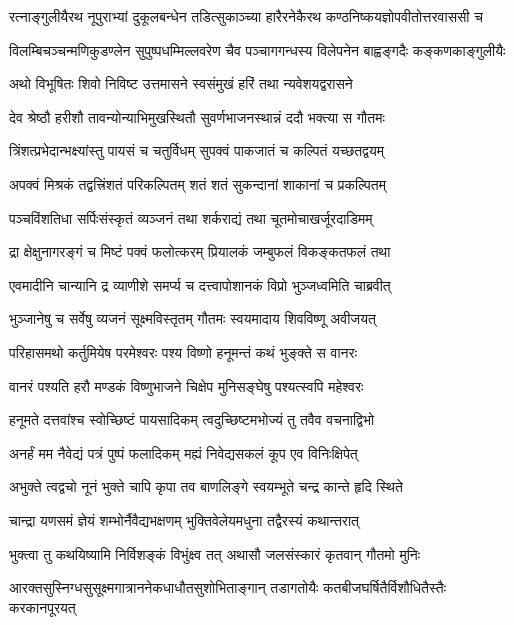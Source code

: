 \twolineshloka
{रत्नाङ्गुलीयैरथ नूपुराभ्यां दुकूलबन्धेन तडित्सुकाञ्च्या}
{हारैरनेकैरथ कण्ठनिष्कयज्ञोपवीतोत्तरवाससी च}%

\twolineshloka
{विलम्बिचञ्चन्मणिकुडण्लेन सुपुष्पधम्मिल्लवरेण चैव}
{पञ्चागगन्धस्य विलेपनेन बाह्वङ्गदैः कङ्कणकाङ्गुलीयैः}%

\twolineshloka
{अथो विभूषितः शिवो निविष्ट उत्तमासने}
{स्वसंमुखं हरिं तथा न्यवेशयद्वरासने}%

\twolineshloka
{देव श्रेष्ठौ हरीशौ तावन्योन्याभिमुखस्थितौ}
{सुवर्णभाजनस्थान्नं ददौ भक्त्या स गौतमः}%

\twolineshloka
{त्रिंशत्प्रभेदान्भक्ष्यांस्तु पायसं च चतुर्विधम्}
{सुपक्वं पाकजातं च कल्पितं यच्छतद्वयम्}%

\twolineshloka
{अपक्वं मिश्रकं तद्वत्त्रिंशतं परिकल्पितम्}
{शतं शतं सुकन्दानां शाकानां च प्रकल्पितम्}%

\twolineshloka
{पञ्चविंशतिधा सर्पिःसंस्कृतं व्यञ्जनं तथा}
{शर्कराद्यं तथा चूतमोचाखर्जूरदाडिमम्}%

\twolineshloka
{द्रा क्षेक्षुनागरङ्गं च मिष्टं पक्वं फलोत्करम्}
{प्रियालकं जम्बुफलं विकङ्कतफलं तथा}%

\twolineshloka
{एवमादीनि चान्यानि द्र व्याणीशे समर्प्य च}
{दत्त्वापोशानकं विप्रो भुञ्जध्वमिति चाब्रवीत्}%

\twolineshloka
{भुञ्जानेषु च सर्वेषु व्यजनं सूक्ष्मविस्तृतम्}
{गौतमः स्वयमादाय शिवविष्णू अवीजयत्}%

\twolineshloka
{परिहासमथो कर्तुमियेष परमेश्वरः}
{पश्य विष्णो हनूमन्तं कथं भुङ्क्ते स वानरः}%

\twolineshloka
{वानरं पश्यति हरौ मण्डकं विष्णुभाजने}
{चिक्षेप मुनिसङ्घेषु पश्यत्स्वपि महेश्वरः}%

\twolineshloka
{हनूमते दत्तवांश्च स्वोच्छिष्टं पायसादिकम्}
{त्वदुच्छिष्टमभोज्यं तु तवैव वचनाद्विभो}%

\twolineshloka
{अनर्हं मम नैवेद्यं पत्रं पुष्पं फलादिकम्}
{मह्यं निवेद्यसकलं कूप एव विनिःक्षिपेत्}%

\twolineshloka
{अभुक्ते त्वद्वचो नूनं भुक्ते चापि कृपा तव}
{बाणलिङ्गे स्वयम्भूते चन्द्र कान्ते हृदि स्थिते}%

\twolineshloka
{चान्द्रा यणसमं ज्ञेयं शम्भोर्नैवैद्यभक्षणम्}
{भुक्तिवेलेयमधुना तद्वैरस्यं कथान्तरात्}%

\twolineshloka
{भुक्त्वा तु कथयिष्यामि निर्विशङ्कं विभुंक्ष्व तत्}
{अथासौ जलसंस्कारं कृतवान् गौतमो मुनिः}%

\twolineshloka
{आरक्तसुस्निग्धसुसूक्ष्मगात्राननेकधाधौतसुशोभिताङ्गान्}
{तडागतोयैः कतबीजघर्षितैर्विशौधितैस्तैः करकानपूरयत्}%


